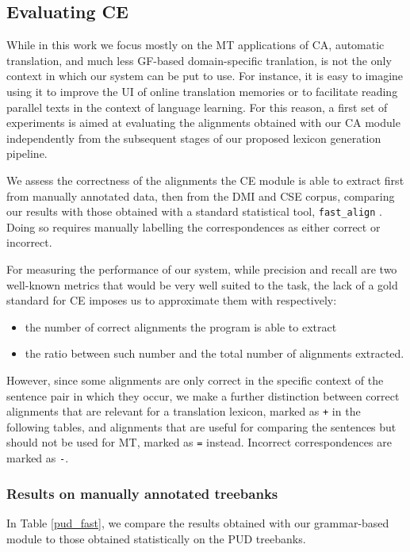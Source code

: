 \documentclass[11pt]{article}
\begin{document}

\subsection{Evaluating CE} %
While in this work we focus mostly on the MT applications of CA, automatic translation, and much less GF-based domain-specific tranlation, is not the only context in which our system can be put to use. 
For instance, it is easy to imagine using it to improve the UI of online translation memories or to facilitate reading parallel texts in the context of language learning.
For this reason, a first set of experiments is aimed at evaluating the alignments obtained with our CA module independently from the subsequent stages of our proposed lexicon generation pipeline.

We assess the correctness of the alignments the CE module is able to extract first from manually annotated data, then from the DMI and CSE corpus, comparing our results with those obtained with a standard statistical tool, \texttt{fast\_align} \cite{TODO:}.
Doing so requires manually labelling the correspondences as either correct or incorrect. 

For measuring the performance of our system, while precision and recall are two well-known metrics that would be very well suited to the task, the lack of a gold standard for CE imposes us to approximate them with respectively:

\begin{itemize}
  \item the number of correct alignments the program is able to extract
  \item the ratio between such number and the total number of alignments extracted.
 \end{itemize}

However, since some alignments are only correct in the specific context of the sentence pair in which they occur, we make a further distinction between correct alignments that are relevant for a translation lexicon, marked as \texttt{+} in the following tables, and alignments that are useful for comparing the sentences but should not be used for MT, marked as \texttt{=} instead.  %
Incorrect correspondences are marked as \texttt{-}. 

\subsubsection{Results on manually annotated treebanks} 
In Table \ref{pud_fast}, we compare the results obtained with our grammar-based module to those obtained statistically on the PUD treebanks. 
\end{document}
